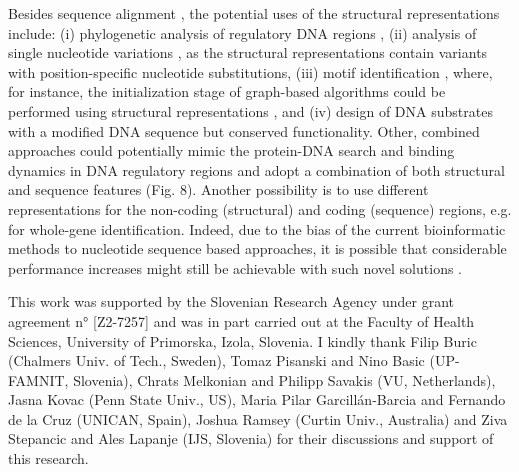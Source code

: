 \documentclass[sigconf]{acmart}
\begin{document}
Besides sequence alignment \cite{Zrimec2020-wx}, the potential uses of the structural representations include: (i) phylogenetic analysis of regulatory DNA regions \cite{Garcillan-Barcia2009-yk}, (ii) analysis of single nucleotide variations \cite{Watson2008-dt}, as the structural representations contain variants with position-specific nucleotide substitutions, (iii) motif identification \cite{Samee2019-xj}, where, for instance, the initialization stage of graph-based algorithms could be performed using structural representations \cite{Stepancic2014-yu}, and (iv) design of DNA substrates with a modified DNA sequence but conserved functionality. Other, combined approaches could potentially mimic the protein-DNA search and binding dynamics in DNA regulatory regions \cite{Marcovitz2013-kg,Levo2015-iu,Slattery2014-ne,Rohs2009-hm} and adopt a combination of both structural and sequence features (Fig. 8). Another possibility is to use different representations for the non-coding (structural) and coding (sequence) regions, e.g. for whole-gene identification. Indeed, due to the bias of the current bioinformatic methods to nucleotide sequence based approaches, it is possible that considerable performance increases might still be achievable with such novel solutions \cite{Zrimec2020-wx, Samee2019-xj}.

\begin{acks}
This work was supported by the Slovenian Research Agency under grant agreement n° [Z2-7257] and was in part carried out at the Faculty of Health Sciences, University of Primorska, Izola, Slovenia. I kindly thank Filip Buric (Chalmers Univ. of Tech., Sweden), Tomaz Pisanski and Nino Basic (UP-FAMNIT, Slovenia), Chrats Melkonian and Philipp Savakis (VU, Netherlands), Jasna Kovac (Penn State Univ., US), Maria Pilar Garcillán-Barcia and Fernando de la Cruz (UNICAN, Spain), Joshua Ramsey (Curtin Univ., Australia) and Ziva Stepancic and Ales Lapanje (IJS, Slovenia) for their discussions and support of this research.
\end{acks}



\end{document}
